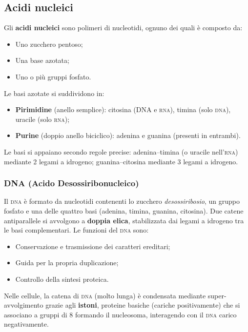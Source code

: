 \documentclass[11pt,a4paper,openright,twoside]{book}
\theoremstyle{definition}
\theoremstyle{plain}
\theoremstyle{remark}
\newcommand{\dna}{\textsc{dna}}
\newcommand{\rna}{\textsc{rna}}
\begin{document}
\subsection{Acidi nucleici}

Gli \textbf{acidi nucleici} sono polimeri di nucleotidi, ognuno dei quali è composto da:
\begin{itemize}
  \item Uno zucchero pentoso;
  \item Una base azotata;
  \item Uno o più gruppi fosfato.
\end{itemize}

Le basi azotate si suddividono in:
\begin{itemize}
  \item \textbf{Pirimidine} (anello semplice): citosina (DNA e \rna), timina (solo \dna), uracile (solo \rna);
  \item \textbf{Purine} (doppio anello biciclico): adenina e guanina (presenti in entrambi).
\end{itemize}

Le basi si appaiano secondo regole precise: adenina--timina (o uracile nell'\rna) mediante 2 legami a idrogeno; guanina--citosina mediante 3 legami a idrogeno.

\subsubsection{DNA (Acido Desossiribonucleico)}

Il \dna{} è formato da nucleotidi contenenti lo zucchero \textit{desossiribosio}, un gruppo fosfato e una delle quattro basi (adenina, timina, guanina, citosina). Due catene antiparallele si avvolgono a \textbf{doppia elica}, stabilizzata dai legami a idrogeno tra le basi complementari. Le funzioni del \dna{} sono:
\begin{itemize}
  \item Conservazione e trasmissione dei caratteri ereditari;
  \item Guida per la propria duplicazione;
  \item Controllo della sintesi proteica.
\end{itemize}

Nelle cellule, la catena di \dna{} (molto lunga) è condensata mediante super-avvolgimento grazie agli \textbf{istoni}, proteine basiche (cariche positivamente) che si associano a gruppi di 8 formando il nucleosoma, interagendo con il \dna{} carico negativamente.
\end{document}
